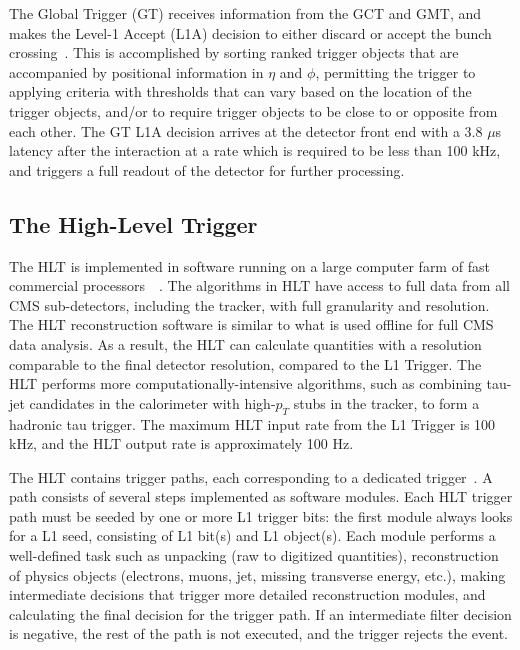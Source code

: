 The Global Trigger (GT) receives information from the GCT and GMT, and makes the Level-1 Accept (L1A) decision to either discard or accept the bunch crossing~\cite{CERN-LHCC-2000-038}. This is accomplished by sorting ranked trigger objects that are accompanied by positional information in $\eta$ and $\phi$, permitting the trigger to applying criteria with thresholds that can vary based on the location of the trigger objects, and/or to require trigger objects to be close to or opposite from each other. The GT L1A decision arrives at the detector front end with a 3.8 $\mu$s latency after the interaction at a rate which is required to be less than 100 kHz, and triggers a full readout of the detector for further processing.



\subsection{The High-Level Trigger}
\label{section:phase-1-high-level-trigger}
The HLT is implemented in software running on a large computer farm of fast commercial processors~\cite{CMS-TDR-022-HLT}~\cite{Foudas:2008dt}. The algorithms in HLT have access to full data from all CMS sub-detectors, including the tracker, with full granularity and resolution. The HLT reconstruction software is similar to what is used offline for full CMS data analysis. As a result, the HLT can calculate quantities with a resolution comparable to the final detector resolution, compared to the L1 Trigger. The HLT performs more computationally-intensive algorithms, such as combining tau-jet candidates in the calorimeter with high-$p_T$ stubs in the tracker, to form a hadronic tau trigger. The maximum HLT input rate from the L1 Trigger is 100 kHz, and the HLT output rate is approximately 100 Hz. 

The HLT contains trigger paths, each corresponding to a dedicated trigger~\cite{twiki_SoftwareGuide_HLT}.  A path consists of several steps implemented as software modules. Each HLT trigger path must be seeded by one or more L1 trigger bits: the first module always looks for a L1 seed, consisting of L1 bit(s) and L1 object(s). Each module performs a well-defined task such as unpacking (raw to digitized quantities), reconstruction of physics objects (electrons, muons, jet, missing transverse energy, etc.), making intermediate decisions that trigger more detailed reconstruction modules, and calculating the final decision for the trigger path. If an intermediate filter decision is negative, the rest of the path is not executed, and the trigger rejects the event.


